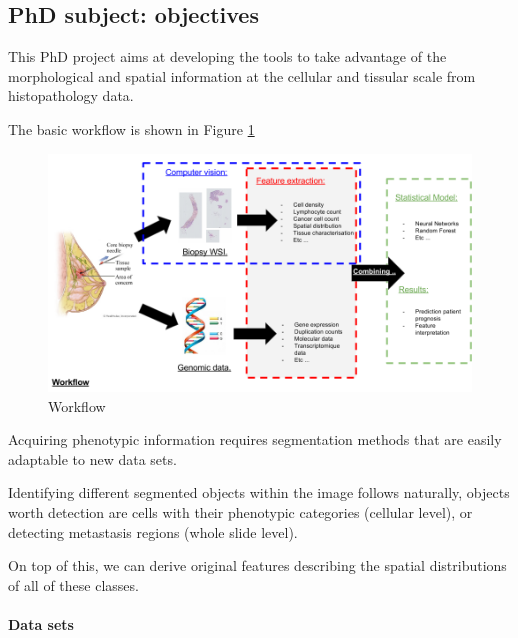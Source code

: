 \documentclass[a4paper,10pt]{article}
\begin{document}
\subsection{PhD subject: objectives}

This  PhD  project aims at developing the tools to take advantage of
the morphological and spatial information at the cellular and tissular
scale from histopathology data. 


The basic workflow is shown in Figure \ref{workflow1}

\begin{figure}[!ht]
\centering
\includegraphics[width=\textwidth]{Workflow.png}
\caption{Workflow}
\label{workflow1}
\end{figure}


Acquiring phenotypic information requires
segmentation methods that are easily adaptable to new data
sets. 

Identifying different segmented objects within the image follows
naturally, objects worth detection are cells with their phenotypic
categories (cellular level), or detecting metastasis regions (whole
slide level). 

On top of this, we can derive original features
describing the spatial distributions of all of these classes. 

\paragraph{Data sets}
\end{document}
